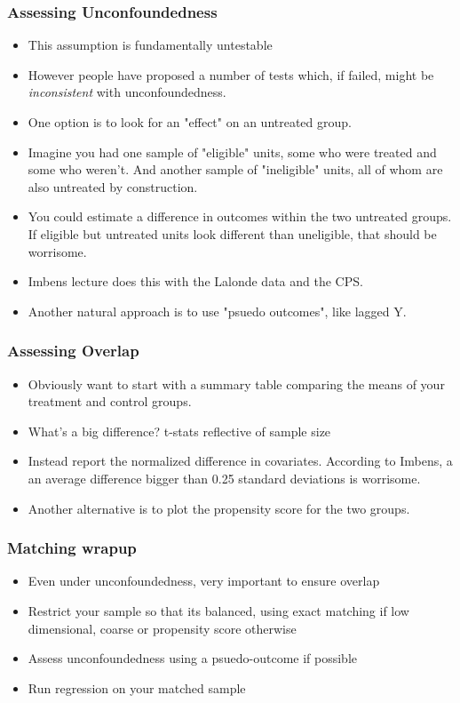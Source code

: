 \begin{frame}
\frametitle{Assessing Unconfoundedness}
\begin{itemize}
\item This assumption is fundamentally untestable
\item However people have proposed a number of tests which, if failed, might be \textit{inconsistent} with unconfoundedness. 
\item One option is to look for an "effect" on an untreated group. 
\item Imagine you had one sample of "eligible" units, some who were treated and some who weren't. And another sample of "ineligible" units, all of whom are also untreated by construction. 
\item You could estimate a difference in outcomes within the two untreated groups. If eligible but untreated units look different than uneligible, that should be worrisome. 
\item Imbens lecture does this with the Lalonde data and the CPS. 
\item Another natural approach is to use "psuedo outcomes", like lagged Y. 
\end{itemize}
\end{frame}

\begin{frame}
  \frametitle{Assessing Overlap}
  \begin{itemize}
  \item Obviously want to start with a summary table comparing the means of your treatment and control groups. 
  \item What's a big difference? t-stats reflective of sample size 
  \item Instead report the normalized difference in covariates. According to Imbens, a an average difference bigger than 0.25 standard deviations is worrisome. 
  \item Another alternative is to plot the propensity score for the two groups. 
  \end{itemize}
\end{frame}

\begin{frame}
  \frametitle{Matching wrapup}
  \begin{itemize}
  \item Even under unconfoundedness, very important to ensure overlap
  \item Restrict your sample so that its balanced, using exact matching if low dimensional, coarse or propensity score otherwise
  \item Assess unconfoundedness using a psuedo-outcome if possible 
  \item Run regression on your matched sample 
  \end{itemize}
\end{frame}

